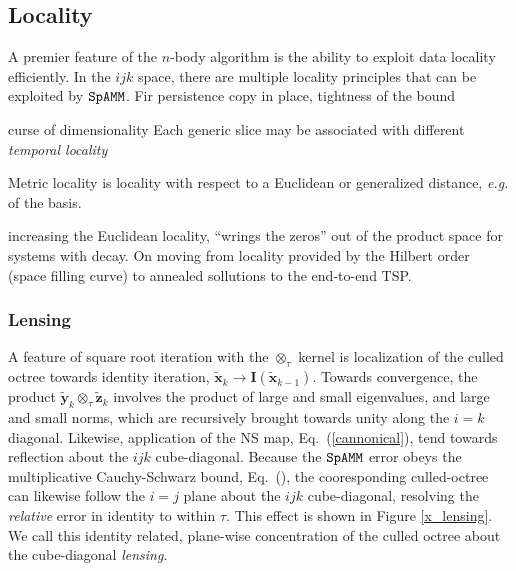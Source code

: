\documentclass[letterpaper,twocolumn,amsmath,amsfont,amssymb,english,aps,jcp,preprintnumbers,groupaddress,nofootinbib,tightenlines,floatfix]{revtex4}
\newcommand{\mat}[1]{\boldsymbol{#1}}
\newcommand{\ot}{  {\scriptstyle \otimes}_{ \tau } }
\theoremstyle{plain}
\theoremstyle{remark}
\theoremstyle{plain}
\begin{document}

\subsection{Locality} 

A premier feature of the $n$-body algorithm is the ability to exploit data locality efficiently.  In the $ijk$ space, 
there are multiple locality principles that can be exploited by $\tt SpAMM$.  Fir
persistence
copy in place, tightness of the bound

curse of dimensionality
Each generic slice may be associated with different {\em temporal locality}


Metric locality is locality with respect to a Euclidean or generalized distance, {\em e.g.} of the basis.  

increasing the Euclidean locality, ``wrings the zeros'' out of the product space for systems with decay.
On moving from locality provided by the Hilbert order (space filling curve) to annealed sollutions to the
end-to-end TSP.    

\subsubsection{Lensing}

A feature of square root iteration with the $\ot$ kernel is localization of the culled octree towards identity iteration, 
$\widetilde{\mat{x}}_k \rightarrow \mat{I}\left( \widetilde{\mat{x}}_{k-1} \right)$.  Towards convergence,  
the product $\widetilde{\mat{y}}_k \ot \widetilde{\mat{z}}_k$ involves the product of large and small eigenvalues, and large and small norms, 
which are recursively brought towards unity along the $i=k$ diagonal.  Likewise, application of the NS map, Eq.~(\ref{cannonical}),  tend towards 
reflection about the $ijk$ cube-diagonal.   Because the $\tt SpAMM$ error obeys the multiplicative Cauchy-Schwarz bound, Eq.~(),  the 
cooresponding culled-octree can likewise follow the $i=j$ plane about the $ijk$ cube-diagonal, resolving the {\em relative} error in identity to within $\tau$.    This effect is shown in Figure \ref{x_lensing}.   
We call this identity related,  plane-wise concentration of the culled octree  about the cube-diagonal {\em lensing}.  
\end{document}
